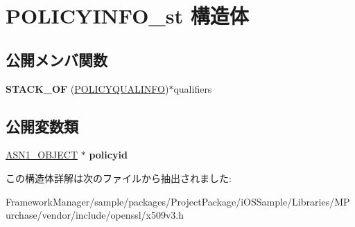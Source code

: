 \hypertarget{struct_p_o_l_i_c_y_i_n_f_o__st}{}\section{P\+O\+L\+I\+C\+Y\+I\+N\+F\+O\+\_\+st 構造体}
\label{struct_p_o_l_i_c_y_i_n_f_o__st}
\subsection*{公開メンバ関数}
\begin{DoxyCompactItemize}
\item 
\hypertarget{struct_p_o_l_i_c_y_i_n_f_o__st_a074f0246ac141ce515ffaffc9e202e9d}{}{\bfseries S\+T\+A\+C\+K\+\_\+\+O\+F} (\hyperlink{struct_p_o_l_i_c_y_q_u_a_l_i_n_f_o__st}{P\+O\+L\+I\+C\+Y\+Q\+U\+A\+L\+I\+N\+F\+O})$\ast$qualifiers\label{struct_p_o_l_i_c_y_i_n_f_o__st_a074f0246ac141ce515ffaffc9e202e9d}

\end{DoxyCompactItemize}
\subsection*{公開変数類}
\begin{DoxyCompactItemize}
\item 
\hypertarget{struct_p_o_l_i_c_y_i_n_f_o__st_afa7cdfb1bac54134558368a3fe4cb61d}{}\hyperlink{structasn1__object__st}{A\+S\+N1\+\_\+\+O\+B\+J\+E\+C\+T} $\ast$ {\bfseries policyid}\label{struct_p_o_l_i_c_y_i_n_f_o__st_afa7cdfb1bac54134558368a3fe4cb61d}

\end{DoxyCompactItemize}


この構造体詳解は次のファイルから抽出されました\+:\begin{DoxyCompactItemize}
\item 
Framework\+Manager/sample/packages/\+Project\+Package/i\+O\+S\+Sample/\+Libraries/\+M\+Purchase/vendor/include/openssl/x509v3.\+h\end{DoxyCompactItemize}
